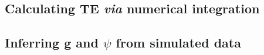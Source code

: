 
\subsection{Calculating TE {\it via} numerical integration}
\label{sec:methods_TE-by-integration}

\subsection{Inferring g and $\psi$ from simulated data}
\label{sec:methods_g-psi-inference}

